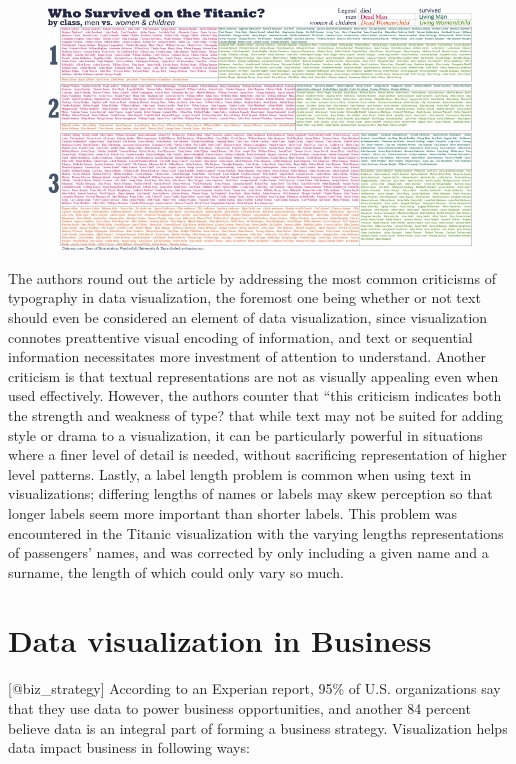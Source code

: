 \documentclass[]{book}
\theoremstyle{definition}
\theoremstyle{definition}
\theoremstyle{definition}
\theoremstyle{remark}
\begin{document}
\begin{figure}
\centering
\includegraphics{images/TypographicTitanic.jpg}
\caption{}
\end{figure}

The authors round out the article by addressing the most common
criticisms of typography in data visualization, the foremost one being
whether or not text should even be considered an element of data
visualization, since visualization connotes preattentive visual encoding
of information, and text or sequential information necessitates more
investment of attention to understand. Another criticism is that textual
representations are not as visually appealing even when used
effectively. However, the authors counter that ``this criticism
indicates both the strength and weakness of type? that while text may
not be suited for adding style or drama to a visualization, it can be
particularly powerful in situations where a finer level of detail is
needed, without sacrificing representation of higher level patterns.
Lastly, a label length problem is common when using text in
visualizations; differing lengths of names or labels may skew perception
so that longer labels seem more important than shorter labels. This
problem was encountered in the Titanic visualization with the varying
lengths representations of passengers' names, and was corrected by only
including a given name and a surname, the length of which could only
vary so much.

\section{Data visualization in
Business}\label{data-visualization-in-business}

{[}@biz\_strategy{]} According to an Experian report, 95\% of U.S.
organizations say that they use data to power business opportunities,
and another 84 percent believe data is an integral part of forming a
business strategy. Visualization helps data impact business in following
ways:
\end{document}

